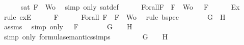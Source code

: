 \begin{isabellebody}
\ \ \ \ \isamarkupfalse%
\ {\isacartoucheopen}sat\ {\isacharparenleft}{\isacharbraceleft}F{\isacharbraceright}\ {\isasymunion}\ Wo{\isacharparenright}{\isacartoucheclose}\ \isamarkupfalse%
\ {\isacharparenleft}simp\ only{\isacharcolon}\ sat{\isacharunderscore}def{\isacharparenright}\isanewline
\ \ \isamarkupfalse%
\ {\isasymA}\ \ Forall{}{\isacharcolon}{\isachardoublequoteopen}{\isasymforall}F\ {\isasymin}\ {\isacharparenleft}{\isacharbraceleft}F{\isacharbraceright}\ {\isasymunion}\ Wo{\isacharparenright}{\isachardot}\ {\isasymA}\ {\isasymTurnstile}\ F{\isachardoublequoteclose}\isanewline
\ \ \ \ \isamarkupfalse%
\ Ex{}\ \isamarkupfalse%
\ {\isacharparenleft}rule\ exE{\isacharparenright}\isanewline
\ \ \isamarkupfalse%
\ {\isachardoublequoteopen}{\isasymA}\ {\isasymTurnstile}\ F{\isachardoublequoteclose}\isanewline
\ \ \ \ \isamarkupfalse%
\ Forall{}\ {\isacartoucheopen}F\ {\isasymin}\ {\isacharbraceleft}F{\isacharbraceright}\ {\isasymunion}\ Wo{\isacartoucheclose}\ \isamarkupfalse%
\ {\isacharparenleft}rule\ bspec{\isacharparenright}\isanewline
\ \ \isamarkupfalse%
\ \isamarkupfalse%
\ {\isachardoublequoteopen}{\isasymA}\ {\isasymTurnstile}\ {\isacharparenleft}G\ \isactrlbold {\isasymrightarrow}\ H{\isacharparenright}{\isachardoublequoteclose}\isanewline
\ \ \ \ \isamarkupfalse%
\ assms{\isacharparenleft}{}{\isacharparenright}\ \isamarkupfalse%
\ {\isacharparenleft}simp\ only{\isacharcolon}\ {\isacartoucheopen}{\isasymA}\ {\isasymTurnstile}\ F{\isacartoucheclose}{\isacharparenright}\isanewline
\ \ \isamarkupfalse%
\ \isamarkupfalse%
\ {\isachardoublequoteopen}{\isasymA}\ {\isasymTurnstile}\ G\ {\isasymlongrightarrow}\ {\isasymA}\ {\isasymTurnstile}\ H{\isachardoublequoteclose}\isanewline
\ \ \ \ \isamarkupfalse%
\ {\isacharparenleft}simp\ only{\isacharcolon}\ formula{\isacharunderscore}semantics{\isachardot}simps{\isacharparenleft}{}{\isacharparenright}{\isacharparenright}\isanewline
\ \ \isamarkupfalse%
\ \isamarkupfalse%
\ {\isachardoublequoteopen}{\isacharparenleft}{\isasymnot}{\isacharparenleft}{\isasymnot}\ {\isasymA}\ {\isasymTurnstile}\ G{\isacharparenright}{\isacharparenright}\ {\isasymlongrightarrow}\ {\isasymA}\ {\isasymTurnstile}\ H{\isachardoublequoteclose}\isanewline
\ \ \ \ \isamarkupfalse%

\end{isabellebody}
